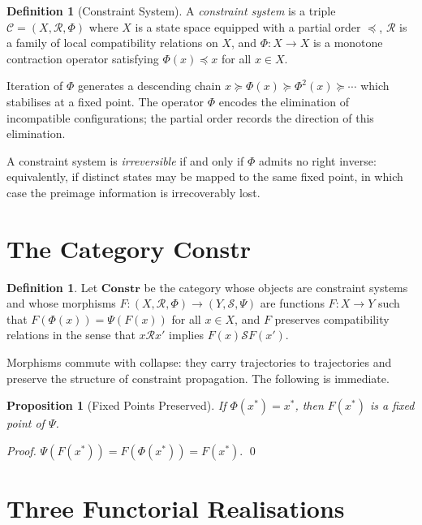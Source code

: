 \documentclass[12pt, oneside]{amsbook}
\theoremstyle{plain}
\newtheorem{proposition}[theorem]{Proposition}
\theoremstyle{definition}
\newtheorem{definition}[theorem]{Definition}
\theoremstyle{remark}
\begin{document}
\begin{definition}[Constraint System]
\label{def:constraint-system}
A \emph{constraint system} is a triple $\mathcal{C} = (X, \mathcal{R}, \Phi)$
where $X$ is a state space equipped with a partial order $\preceq$,
$\mathcal{R}$ is a family of local compatibility relations on $X$, and
$\Phi : X \to X$ is a monotone contraction operator satisfying
$\Phi(x) \preceq x$ for all $x \in X$.
\end{definition}

Iteration of $\Phi$ generates a descending chain
$x \succeq \Phi(x) \succeq \Phi^2(x) \succeq \cdots$
which stabilises at a fixed point. The operator $\Phi$ encodes the elimination
of incompatible configurations; the partial order records the direction of this
elimination.

A constraint system is \emph{irreversible} if and only if $\Phi$ admits no
right inverse: equivalently, if distinct states may be mapped to the same
fixed point, in which case the preimage information is irrecoverably lost.

\section{The Category Constr}
\label{sec:constr:category}

\begin{definition}
Let $\mathbf{Constr}$ be the category whose objects are constraint systems and
whose morphisms $F : (X, \mathcal{R}, \Phi) \to (Y, \mathcal{S}, \Psi)$ are
functions $F : X \to Y$ such that $F(\Phi(x)) = \Psi(F(x))$ for all
$x \in X$, and $F$ preserves compatibility relations in the sense that
$x \mathrel{\mathcal{R}} x'$ implies $F(x) \mathrel{\mathcal{S}} F(x')$.
\end{definition}

Morphisms commute with collapse: they carry trajectories to trajectories and
preserve the structure of constraint propagation. The following is immediate.

\begin{proposition}[Fixed Points Preserved]
\label{prop:fixed-preserved}
If $\Phi(x^*) = x^*$, then $F(x^*)$ is a fixed point of $\Psi$.
\end{proposition}

\begin{proof}
$\Psi(F(x^*)) = F(\Phi(x^*)) = F(x^*)$. \qed
\end{proof}

\section{Three Functorial Realisations}
\label{sec:constr:functors}
\end{document}
